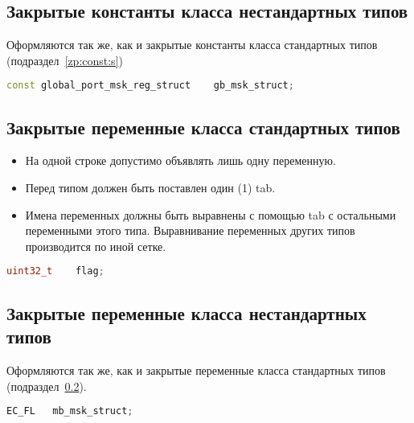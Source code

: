 \subsection{Закрытые константы класса нестандартных типов}\label{zp:const:n}
Оформляются так же, как и закрытые константы класса стандартных типов (подраздел~\ref{zp:const:s})\begin{lstlisting}[language=C++, frame=tlBR, basicstyle=\fontsize{10}{10}\ttfamily]
	const global_port_msk_reg_struct	gb_msk_struct;
\end{lstlisting}

\subsection{Закрытые переменные класса стандартных типов}\label{zp:pp:s}
\begin{itemize}
	\item На одной строке допустимо объявлять лишь одну переменную.
	\item Перед типом должен быть поставлен один (1) tab.
	\item Имена переменных должны быть выравнены с помощью tab с остальными переменными этого типа. Выравнивание переменных других типов производится по иной сетке.
\end{itemize}\begin{lstlisting}[language=C++, frame=tlBR, basicstyle=\fontsize{10}{10}\ttfamily]
	uint32_t	flag;
\end{lstlisting}

\subsection{Закрытые переменные класса нестандартных типов}\label{zp:pp:n}
Оформляются так же, как и закрытые переменные класса стандартных типов (подраздел~\ref{zp:pp:s}).\begin{lstlisting}[language=C++, frame=tlBR, basicstyle=\fontsize{10}{10}\ttfamily]
	EC_FL	mb_msk_struct;
\end{lstlisting}